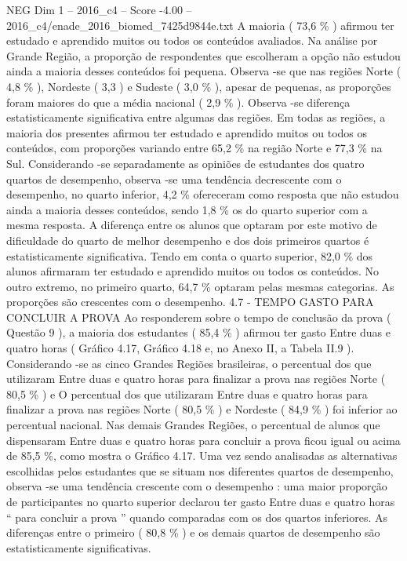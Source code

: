 \begin{textsample}{NEG Dim 1 – 2016\_c4 – Score -4.00 – 2016\_c4/enade\_2016\_biomed\_7425d9844e.txt}
A maioria ( 73,6 \% ) afirmou ter estudado e aprendido muitos ou todos os conteúdos avaliados.
Na análise por Grande Região, a proporção de respondentes que escolheram a opção não estudou ainda a maioria desses conteúdos foi pequena.
Observa -se que nas regiões Norte ( 4,8 \% ), Nordeste ( 3,3 ) e Sudeste ( 3,0 \% ), apesar de pequenas, as proporções foram maiores do que a média nacional ( 2,9 \% ).
Observa -se diferença estatisticamente significativa entre algumas das regiões.
Em todas as regiões, a maioria dos presentes afirmou ter estudado e aprendido muitos ou todos os conteúdos, com proporções variando entre 65,2 \% na região Norte e 77,3 \% na Sul.
Considerando -se separadamente as opiniões de estudantes dos quatro quartos de desempenho, observa -se uma tendência decrescente com o desempenho, no quarto inferior, 4,2 \% ofereceram como resposta que não estudou ainda a maioria desses conteúdos, sendo 1,8 \% os do quarto superior com a mesma resposta.
A diferença entre os alunos que optaram por este motivo de dificuldade do quarto de melhor desempenho e dos dois primeiros quartos é estatisticamente significativa.
Tendo em conta o quarto superior, 82,0 \% dos alunos afirmaram ter estudado e aprendido muitos ou todos os conteúdos.
No outro extremo, no primeiro quarto, 64,7 \% optaram pelas mesmas categorias.
As proporções são crescentes com o desempenho. 4.7 - TEMPO GASTO PARA CONCLUIR A PROVA Ao responderem sobre o tempo de conclusão da prova ( Questão 9 ), a maioria dos estudantes ( 85,4 \% ) afirmou ter gasto Entre duas e quatro horas ( Gráfico 4.17, Gráfico 4.18 e, no Anexo II, a Tabela II.9 ).
Considerando -se as cinco Grandes Regiões brasileiras, o percentual dos que utilizaram Entre duas e quatro horas para finalizar a prova nas regiões Norte ( 80,5 \% ) e O percentual dos que utilizaram Entre duas e quatro horas para finalizar a prova nas regiões Norte ( 80,5 \% ) e Nordeste ( 84,9 \% ) foi inferior ao percentual nacional.
Nas demais Grandes Regiões, o percentual de alunos que dispensaram Entre duas e quatro horas para concluir a prova ficou igual ou acima de 85,5 \%, como mostra o Gráfico 4.17.
Uma vez sendo analisadas as alternativas escolhidas pelos estudantes que se situam nos diferentes quartos de desempenho, observa -se uma tendência crescente com o desempenho : uma maior proporção de participantes no quarto superior declarou ter gasto Entre duas e quatro horas “ para concluir a prova ” quando comparadas com os dos quartos inferiores.
As diferenças entre o primeiro ( 80,8 \% ) e os demais quartos de desempenho são estatisticamente significativas.

\end{textsample}
